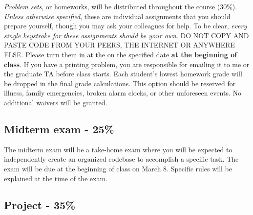 \documentclass[11pt]{article}
\begin{document}
\noindent \textit{Problem sets}, or homeworks, will be distributed
throughout the course (30\%). \textit{Unless otherwise specified},
these are individual assignments that you should prepare yourself,
though you may ask your colleagues for help. To be clear,
\textit{every single keystroke for these assignments should be your
  own}.  DO NOT COPY AND PASTE CODE FROM YOUR PEERS, THE INTERNET OR
ANYWHERE ELSE.  Please turn them in at the on the specified date
\textbf{at the beginning of class}. If you have a printing problem,
you are responsible for emailing it to me or the graduate TA before
class starts.  Each student's lowest homework grade will be dropped in
the final grade calculations.  This option should be reserved for
illness, family emergencies, broken alarm clocks, or other unforeseen
events.  No additional waivers will be granted.


\subsection*{Midterm exam - 25\%}
The midterm exam will be a take-home exam where you will be expected
to independently create an organized codebase to accomplish a specific
task. The exam will be due at the beginning of class on March 8.  Specific rules will be
explained at the time of the exam.


\subsection*{Project - 35\%}
\end{document}
